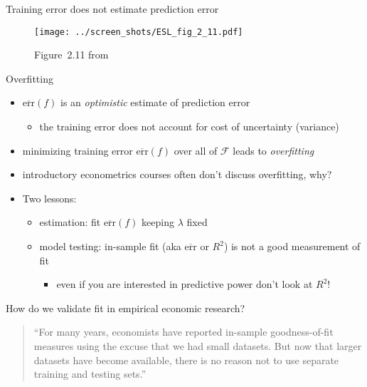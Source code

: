 \documentclass[xcolor=dvipsnames, handout]{beamer}
\begin{document}
\begin{frame}{Training error does not estimate prediction error}
\begin{figure}
  \texttt{[image: ../screen\_shots/ESL\_fig\_2\_11.pdf]}
   \caption{Figure~2.11 from \textcite{hastie2009elements}}
\end{figure}
\end{frame}


\begin{frame}{Overfitting}
\begin{itemize}
  \item $\overline{\text{err}} (f)$ is an \emph{optimistic} estimate of prediction error
  \begin{itemize}
    \item the training error does not account for cost of uncertainty (variance)
  \end{itemize}
\pause
  \item minimizing training error $\overline{\text{err}} (f)$ over all of $\mathcal{F}$ leads to \emph{overfitting}
\pause 
  \item introductory econometrics courses often don't discuss overfitting, why? 
\pause
  \item Two lessons: 
  \begin{itemize}
    \pause\item estimation: fit $\overline{\text{err}} (f)$ keeping $\lambda$ fixed
    \pause\item model testing: in-sample fit (aka $\overline{\text{err}}$ or $R^2$) is not a good measurement of fit
    \begin{itemize}
      \item even if you are interested in predictive power don't look at $R^2$!
    \end{itemize}
  \end{itemize}
\end{itemize}
\end{frame}


\begin{frame}{How do we validate fit in empirical economic research?}
\begin{quote}
``For many years, economists have reported in-sample goodness-of-fit measures using the excuse that we had small datasets. But now that larger datasets have become available, there is no reason not to use separate training and testing sets.'' \parencite{varian2014big}
\end{quote}
\end{frame}
\end{document}
